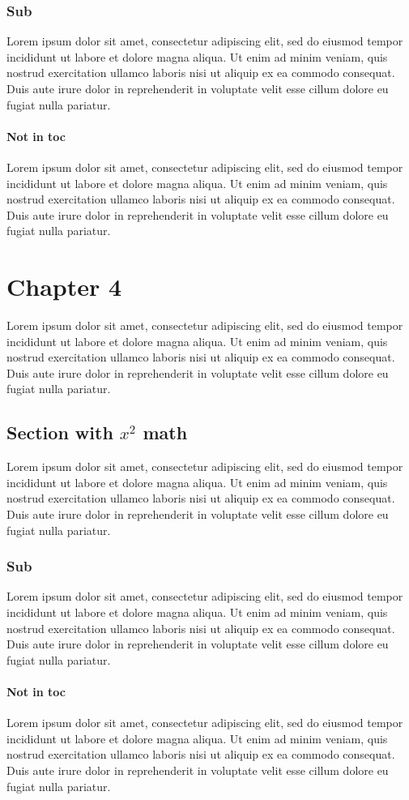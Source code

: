 \documentclass{report}
\begin{document}
\subsection{Sub}
Lorem ipsum dolor sit amet, consectetur adipiscing elit, sed do eiusmod tempor incididunt ut labore et dolore magna aliqua. Ut enim ad minim veniam, quis nostrud exercitation ullamco laboris nisi ut aliquip ex ea commodo consequat. Duis aute irure dolor in reprehenderit in voluptate velit esse cillum dolore eu fugiat nulla pariatur.

\subsubsection{Not in toc}
Lorem ipsum dolor sit amet, consectetur adipiscing elit, sed do eiusmod tempor incididunt ut labore et dolore magna aliqua. Ut enim ad minim veniam, quis nostrud exercitation ullamco laboris nisi ut aliquip ex ea commodo consequat. Duis aute irure dolor in reprehenderit in voluptate velit esse cillum dolore eu fugiat nulla pariatur.

\chapter{Chapter 4}
Lorem ipsum dolor sit amet, consectetur adipiscing elit, sed do eiusmod tempor incididunt ut labore et dolore magna aliqua. Ut enim ad minim veniam, quis nostrud exercitation ullamco laboris nisi ut aliquip ex ea commodo consequat. Duis aute irure dolor in reprehenderit in voluptate velit esse cillum dolore eu fugiat nulla pariatur.

\section{Section with $x^2$ math}
Lorem ipsum dolor sit amet, consectetur adipiscing elit, sed do eiusmod tempor incididunt ut labore et dolore magna aliqua. Ut enim ad minim veniam, quis nostrud exercitation ullamco laboris nisi ut aliquip ex ea commodo consequat. Duis aute irure dolor in reprehenderit in voluptate velit esse cillum dolore eu fugiat nulla pariatur.

\subsection{Sub}
Lorem ipsum dolor sit amet, consectetur adipiscing elit, sed do eiusmod tempor incididunt ut labore et dolore magna aliqua. Ut enim ad minim veniam, quis nostrud exercitation ullamco laboris nisi ut aliquip ex ea commodo consequat. Duis aute irure dolor in reprehenderit in voluptate velit esse cillum dolore eu fugiat nulla pariatur.

\subsubsection{Not in toc}
Lorem ipsum dolor sit amet, consectetur adipiscing elit, sed do eiusmod tempor incididunt ut labore et dolore magna aliqua. Ut enim ad minim veniam, quis nostrud exercitation ullamco laboris nisi ut aliquip ex ea commodo consequat. Duis aute irure dolor in reprehenderit in voluptate velit esse cillum dolore eu fugiat nulla pariatur.
\end{document}
